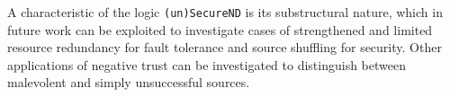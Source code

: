 \documentclass[]{llncs}
\begin{document}
A characteristic of the logic \texttt{(un)SecureND} is its substructural nature, which in future work can be exploited to investigate cases of strengthened and limited resource redundancy for fault tolerance and source shuffling for security. Other applications of negative trust can be investigated to distinguish between malevolent and simply unsuccessful sources.





\end{document}
